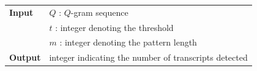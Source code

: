 \begin{figure}[h]
\begin{center}
\begin{minipage}[t]{.8\textwidth}
\begin{algorithm}[H]
\begin{tabular}{ll}
\textbf{Input}  & $Q$ : $Q$-gram sequence\\
				& $t$ : integer denoting the threshold\\
				& $m$ : integer denoting the pattern length\\
\textbf{Output} & integer indicating the number of transcripts detected\\
\end{tabular}
\label{alg:qgram-specificity}
\end{algorithm}
\end{minipage}
\end{center}
\end{figure}


